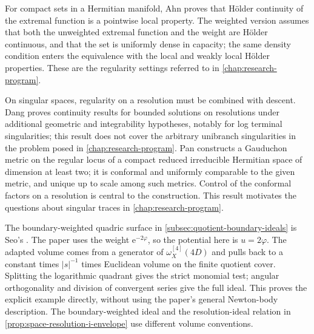For compact sets in a Hermitian manifold, Ahn \cite[v3, Theorems~1.1--1.2, p.~3]{Ahn26} proves that H\"older continuity of the extremal function is a pointwise local property. The weighted version assumes that both the unweighted extremal function and the weight are H\"older continuous, and that the set is uniformly dense in capacity; the same density condition enters the equivalence with the local and weakly local H\"older properties. These are the regularity settings referred to in \cref{chap:research-program}.

On singular spaces, regularity on a resolution must be combined with descent. Dang \cite[v2, Theorem~B]{Dang26} proves continuity results for bounded solutions on resolutions under additional geometric and integrability hypotheses, notably for log terminal singularities; this result does not cover the arbitrary unibranch singularities in the problem posed in \cref{chap:research-program}. Pan \cite[v1, Theorems~A and~A']{Pan25} constructs a Gauduchon metric on the regular locus of a compact reduced irreducible Hermitian space of dimension at least two; it is conformal and uniformly comparable to the given metric, and unique up to scale among such metrics. Control of the conformal factors on a resolution is central to the construction. This result motivates the questions about singular traces in \cref{chap:research-program}.

\label{hist:quotient-boundary-ideals}
The boundary-weighted quadric surface in \cref{subsec:quotient-boundary-ideals} is Seo's \cite[v1, Example~6.2, pp.~29--30]{SeoToricIdeals26}. The paper uses the weight $\mathrm{e}^{-2\varphi}$, so the potential here is $u=2\varphi$. The adapted volume comes from a generator of $\omega_X^{[4]}(4D)$ and pulls back to a constant times $|s|^{-1}$ times Euclidean volume on the finite quotient cover. Splitting the logarithmic quadrant gives the strict monomial test; angular orthogonality and division of convergent series give the full ideal. This proves the explicit example directly, without using the paper's general Newton-body description. The boundary-weighted ideal and the resolution-ideal relation in \cref{prop:space-resolution-i-envelope} use different volume conventions.

